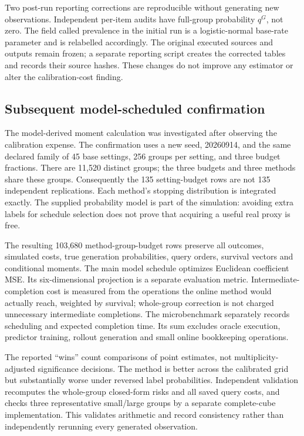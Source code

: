 Two post-run reporting corrections are reproducible without generating new observations. Independent per-item audits have full-group probability $q^G$, not zero. The field called prevalence in the initial run is a logistic-normal base-rate parameter and is relabelled accordingly. The original executed sources and outputs remain frozen; a separate reporting script creates the corrected tables and records their source hashes. These changes do not improve any estimator or alter the calibration-cost finding.

\subsection{Subsequent model-scheduled confirmation}
The model-derived moment calculation was investigated after observing the calibration expense. The confirmation uses a new seed, 20260914, and the same declared family of 45 base settings, 256 groups per setting, and three budget fractions. There are 11,520 distinct groups; the three budgets and three methods share these groups. Consequently the 135 setting-budget rows are not 135 independent replications. Each method's stopping distribution is integrated exactly. The supplied probability model is part of the simulation: avoiding extra labels for schedule selection does not prove that acquiring a useful real proxy is free.

The resulting 103,680 method-group-budget rows preserve all outcomes, simulated costs, true generation probabilities, query orders, survival vectors and conditional moments. The main model schedule optimizes Euclidean coefficient MSE. Its six-dimensional projection is a separate evaluation metric. Intermediate-completion cost is measured from the operations the online method would actually reach, weighted by survival; whole-group correction is not charged unnecessary intermediate completions. The microbenchmark separately records scheduling and expected completion time. Its sum excludes oracle execution, predictor training, rollout generation and small online bookkeeping operations.

The reported ``wins'' count comparisons of point estimates, not multiplicity-adjusted significance decisions. The method is better across the calibrated grid but substantially worse under reversed label probabilities. Independent validation recomputes the whole-group closed-form risks and all saved query costs, and checks three representative small/large groups by a separate complete-cube implementation. This validates arithmetic and record consistency rather than independently rerunning every generated observation.

